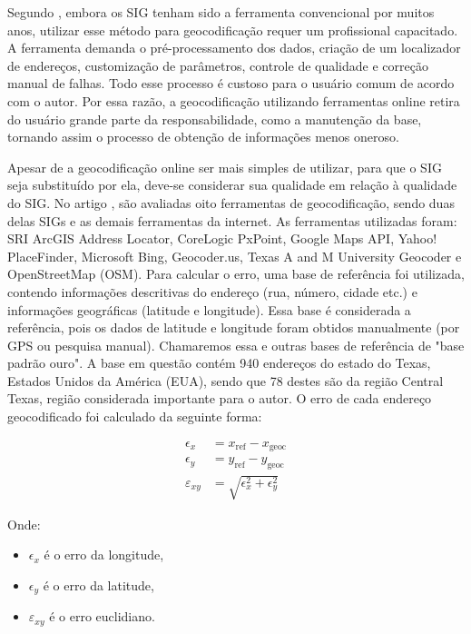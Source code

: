 Segundo \cite{Chow2016}, embora os SIG tenham sido a ferramenta convencional por muitos anos, utilizar esse método para geocodificação requer um profissional capacitado. A ferramenta demanda o pré-processamento dos dados, criação de um localizador de endereços, customização de parâmetros, controle de qualidade e correção manual de falhas. Todo esse processo é custoso para o usuário comum de acordo com o autor. Por essa razão, a geocodificação utilizando ferramentas online retira do usuário grande parte da responsabilidade, como a manutenção da base, tornando assim o processo de obtenção de informações menos oneroso.

Apesar de a geocodificação online ser mais simples de utilizar, para que o SIG seja substituído por ela, deve-se considerar sua qualidade em relação à qualidade do SIG. No artigo \cite{Chow2016}, são avaliadas oito ferramentas de geocodificação, sendo duas delas SIGs e as demais ferramentas da internet. As ferramentas utilizadas foram: SRI ArcGIS Address Locator, CoreLogic PxPoint, Google Maps API, Yahoo! PlaceFinder, Microsoft Bing, Geocoder.us, Texas A and M University Geocoder e OpenStreetMap (OSM). Para calcular o erro, uma base de referência foi utilizada, contendo informações descritivas do endereço (rua, número, cidade etc.) e informações geográficas (latitude e longitude). Essa base é considerada a referência, pois os dados de latitude e longitude foram obtidos manualmente (por GPS ou pesquisa manual). Chamaremos essa e outras bases de referência de "base padrão ouro". A base em questão contém 940 endereços do estado do Texas, Estados Unidos da América (EUA), sendo que 78 destes são da região Central Texas, região considerada importante para o autor. O erro de cada endereço geocodificado foi calculado da seguinte forma:

\begin{align}
   \epsilon_x &= x_{\text{ref}} - x_{\text{geoc}} \\
   \epsilon_y &= y_{\text{ref}} - y_{\text{geoc}} \\
   \varepsilon_{xy} &= \sqrt{\epsilon_x^2 + \epsilon_y^2}
\end{align}

Onde:
\begin{itemize}
   \item $\epsilon_x$ é o erro da longitude,
   \item $\epsilon_y$ é o erro da latitude,
   \item $\varepsilon_{xy}$ é o erro euclidiano.
\end{itemize}
   
